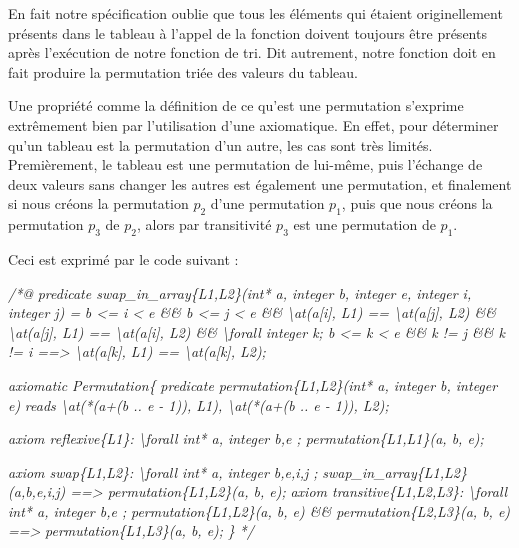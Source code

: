 \documentclass[12pt,francais,]{scrbook}
\newenvironment{Shaded}{}{}
\newcommand{\CommentTok}[1]{\textcolor[rgb]{0.38,0.63,0.69}{\textit{{#1}}}}
\begin{document}
En fait notre spécification oublie que tous les éléments qui étaient
originellement présents dans le tableau à l'appel de la fonction doivent
toujours être présents après l'exécution de notre fonction de tri. Dit
autrement, notre fonction doit en fait produire la permutation triée des
valeurs du tableau.

Une propriété comme la définition de ce qu'est une permutation s'exprime
extrêmement bien par l'utilisation d'une axiomatique. En effet, pour
déterminer qu'un tableau est la permutation d'un autre, les cas sont
très limités. Premièrement, le tableau est une permutation de lui-même,
puis l'échange de deux valeurs sans changer les autres est également une
permutation, et finalement si nous créons la permutation \(p_2\) d'une
permutation \(p_1\), puis que nous créons la permutation \(p_3\) de
\(p_2\), alors par transitivité \(p_3\) est une permutation de \(p_1\).

Ceci est exprimé par le code suivant :

\begin{footnotesize}\begin{Shaded}
\begin{Highlighting}[]
\CommentTok{/*@}
\CommentTok{  predicate swap_in_array\{L1,L2\}(int* a, integer b, integer e, integer i, integer j) =}
\CommentTok{    b <= i < e && b <= j < e &&}
\CommentTok{    \textbackslash{}at(a[i], L1) == \textbackslash{}at(a[j], L2) && \textbackslash{}at(a[j], L1) == \textbackslash{}at(a[i], L2) &&}
\CommentTok{    \textbackslash{}forall integer k; b <= k < e && k != j && k != i ==> \textbackslash{}at(a[k], L1) == \textbackslash{}at(a[k], L2);}

\CommentTok{  axiomatic Permutation\{}
\CommentTok{    predicate permutation\{L1,L2\}(int* a, integer b, integer e)}
\CommentTok{     reads \textbackslash{}at(*(a+(b .. e - 1)), L1), \textbackslash{}at(*(a+(b .. e - 1)), L2);}

\CommentTok{    axiom reflexive\{L1\}: }
\CommentTok{      \textbackslash{}forall int* a, integer b,e ; permutation\{L1,L1\}(a, b, e);}

\CommentTok{    axiom swap\{L1,L2\}:}
\CommentTok{      \textbackslash{}forall int* a, integer b,e,i,j ;}
\CommentTok{        swap_in_array\{L1,L2\}(a,b,e,i,j) ==> permutation\{L1,L2\}(a, b, e);}
\CommentTok{    }
\CommentTok{    axiom transitive\{L1,L2,L3\}:}
\CommentTok{      \textbackslash{}forall int* a, integer b,e ; }
\CommentTok{        permutation\{L1,L2\}(a, b, e) && permutation\{L2,L3\}(a, b, e) ==>}
\CommentTok{          permutation\{L1,L3\}(a, b, e);}
\CommentTok{  \}}
\CommentTok{*/}
\end{Highlighting}
\end{Shaded}\end{footnotesize}
\end{document}
